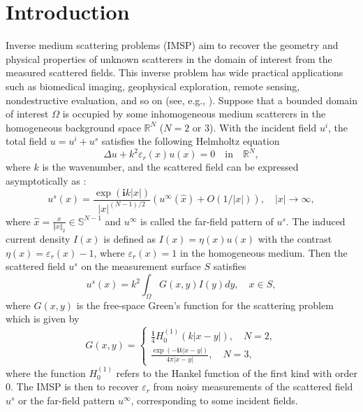 \documentclass{article}
\begin{document}
	\section{Introduction}
	Inverse medium scattering problems (IMSP) aim to recover the geometry and physical properties of unknown scatterers in the domain of interest from the measured scattered fields. This inverse problem has wide practical applications such as biomedical imaging, geophysical exploration, remote sensing, nondestructive evaluation, and so on (see, e.g., \cite{buchanan2004marine,kirsch2011introduction,zhdanov2002geophysical}). Suppose that a bounded domain of interest $\Omega$ is occupied by some inhomogeneous medium scatterers in the homogeneous background space $\mathbb{R}^{N}$ ($N=2$ or $3$). With the incident field $u^{i}$, the total field $u=u^{i}+u^s$ satisfies the following Helmholtz equation \cite{colton1998inverse}
	\begin{equation}
		\Delta u +k^{2}\varepsilon_{r}(x)u(x)=0 \quad \text{in}\quad \mathbb{R}^{N},
	\end{equation}
	where $k$ is the wavenumber,  and the scattered field can be expressed asymptotically as \cite{colton1998inverse}:
	\begin{equation}
		u^{s}(x) = \frac{\exp(\mathbf{i}k|x|)}{|x|^{(N-1)/2}}(u^{\infty}(\hat{x}) + O(1/|x|)), \quad |x|\rightarrow\infty,
		\label{asymptic_us}
	\end{equation}
	where $\hat{x}=\frac{x}{\Vert x\Vert_{2}}\in \mathbb{S}^{N-1}$ and $u^{\infty}$ is called the far-field pattern of $u^{s}$. The induced current density $I(x)$ is defined as $I(x)=\eta(x)u(x)$ with the contrast $\eta(x)=\varepsilon_{r}(x)-1$, where $\varepsilon_{r}(x)=1$ in the homogeneous medium. Then the scattered field $u^s$ on the measurement surface $S$ satisfies \cite{colton1998inverse}
	\begin{equation}
		u^{s}(x)= k^{2}\int_{\Omega}G(x,y)I(y)dy, \quad x \in S,
		\label{data equation}
	\end{equation}
	where $G(x,y)$ is the free-space Green's function for the scattering problem which is given by
	\begin{equation}
		G(x,y)=\left\{
		\begin{aligned}
			\frac{\mathbf{i}}{4}H_{0}^{(1)}(k|x-y|), \quad N=2,\\
			\frac{\exp(-\mathbf{i}k|x-y|)}{4\pi|x-y|}, \quad N=3,
		\end{aligned}
		\right.
	\end{equation}
	where the function $H_{0}^{(1)}$ refers to the Hankel function of the first kind with order $0$. 
	The IMSP is then to recover $\varepsilon_{r}$ from noisy measurements of the scattered field $u^{s}$ or the far-field pattern $u^{\infty}$, corresponding to some incident fields.
	
\end{document}
